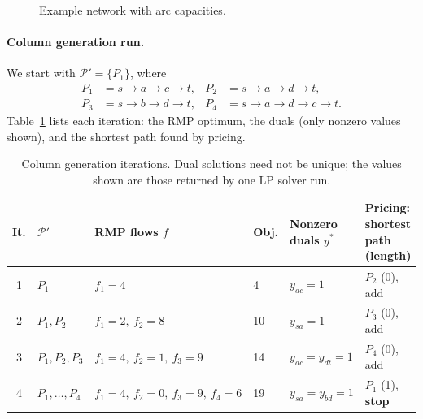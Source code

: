 \documentclass[11pt]{article}
\begin{document}
\begin{figure}[h]
\centering
{}
\caption{Example network with arc capacities.}\label{fig:net}
\end{figure}

\paragraph{Column generation run.} We start with $\mathcal{P}'=\{P_1\}$, where
\begin{align*}
P_1&=s\to a\to c\to t, & P_2&=s\to a\to d\to t,\\
P_3&=s\to b\to d\to t, & P_4&=s\to a\to d\to c\to t.
\end{align*}
Table~\ref{tab:iter} lists each iteration: the RMP optimum, the duals (only nonzero values shown), and the shortest path found by pricing.

\begin{table}[h]
\centering
\footnotesize
\setlength{\tabcolsep}{4pt}
\begin{tabular}{@{}clllll@{}}
\toprule
It. & $\mathcal{P}'$ & RMP flows $f$ & Obj. & Nonzero duals $y^*$ & Pricing: shortest path (length) \\
\midrule
1 & $P_1$ & $f_1=4$ & 4 & $y_{ac}=1$ & $P_2$ (0), add \\
2 & $P_1,P_2$ & $f_1=2,\ f_2=8$ & 10 & $y_{sa}=1$ & $P_3$ (0), add \\
3 & $P_1,P_2,P_3$ & $f_1=4,\ f_2=1,\ f_3=9$ & 14 & $y_{ac}=y_{dt}=1$ & $P_4$ (0), add \\
4 & $P_1,\dots,P_4$ & $f_1=4,\ f_2=0,\ f_3=9,\ f_4=6$ & 19 & $y_{sa}=y_{bd}=1$ & $P_1$ (1), \textbf{stop} \\
\bottomrule
\end{tabular}
\caption{Column generation iterations. Dual solutions need not be unique; the values shown are those returned by one LP solver run.}\label{tab:iter}
\end{table}
\end{document}
